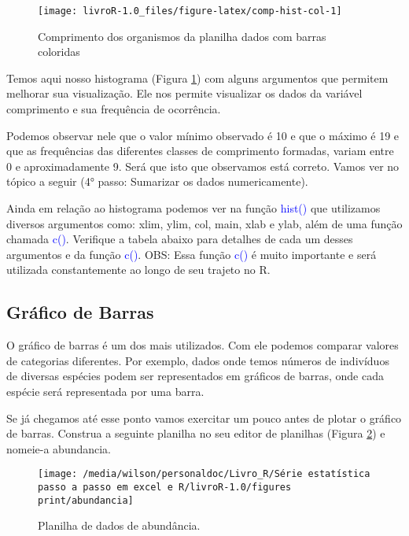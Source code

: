\documentclass[14pt,titlepage, oneside, openany, a4paper]{book}
\begin{document}
\begin{figure}[H]
\texttt{[image: livroR-1.0\_files/figure-latex/comp-hist-col-1]} \caption{Comprimento dos organismos da planilha dados com barras coloridas}\label{fig:comp-hist-col}
\end{figure}

Temos aqui nosso histograma (Figura \ref{fig:comp-hist-col}) com alguns argumentos que permitem melhorar sua visualização. Ele nos permite visualizar os dados da variável comprimento e sua frequência de ocorrência.

Podemos observar nele que o valor mínimo observado é 10 e que o máximo é 19 e que as frequências das diferentes classes de comprimento formadas, variam entre 0 e aproximadamente 9. Será que isto que observamos está correto. Vamos ver no tópico a seguir (4° passo: Sumarizar os dados numericamente).

Ainda em relação ao histograma podemos ver na função \textcolor{blue}{hist()} que utilizamos diversos argumentos como: xlim, ylim, col, main, xlab e ylab, além de uma função chamada \textcolor{blue}{c()}. Verifique a tabela abaixo para detalhes de cada um desses argumentos e da função \textcolor{blue}{c()}. OBS: Essa função \textcolor{blue}{c()} é muito importante e será utilizada constantemente ao longo de seu trajeto no R.

\hypertarget{gruxe1fico-de-barras}{%
\subsection{Gráfico de Barras}\label{gruxe1fico-de-barras}}

O gráfico de barras é um dos mais utilizados. Com ele podemos comparar valores de categorias diferentes. Por exemplo, dados onde temos números de indivíduos de diversas espécies podem ser representados em gráficos de barras, onde cada espécie será representada por uma barra.

Se já chegamos até esse ponto vamos exercitar um pouco antes de plotar o gráfico de barras. Construa a seguinte planilha no seu editor de planilhas (Figura \ref{fig:abundancia}) e nomeie-a abundancia.

\begin{figure}[H]
\texttt{[image: /media/wilson/personaldoc/Livro\_R/Série estatística passo a passo em excel e R/livroR-1.0/figures print/abundancia]} \caption{Planilha de dados de abundância.}\label{fig:abundancia}
\end{figure}
\end{document}
